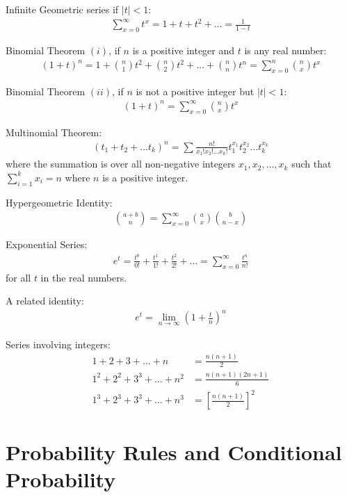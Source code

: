 \documentclass{article}
\begin{document}
Infinite Geometric series if $|t| < 1$:
\begin{align*}
    \sum_{x=0}^{\infty} t^x = 1 + t + t^2 + \ldots = \frac{1}{1-t}
\end{align*}

Binomial Theorem $(i)$, if $n$ is a positive integer and $t$ is any real number:
\begin{align*}
    (1+t)^n = 1 + \binom{n}{1}t^2 + \binom{n}{2}t^2 + \ldots + \binom{n}{n}t^n = \sum_{x=0}^n \binom{n}{x}t^x
\end{align*}

Binomial Theorem $(ii)$, if $n$ is not a positive integer but $|t| < 1$:
\begin{align*}
    (1+t)^n = \sum_{x=0}^{\infty}\binom{n}{x}t^x
\end{align*}

Multinomial Theorem:
\begin{align*}
    (t_1 + t_2 + \ldots t_k)^n  = \sum \frac{n!}{x_1!x_2! \ldots x_k!}t_1^{x_1}t_2^{x_2}\ldots t_k^{x_k}
\end{align*}
where the summation is over all non-negative integers $x_1, x_2, \ldots, x_k$ such that $\sum_{i=1}^{k}x_i = n$ where $n$ is a positive integer. 

Hypergeometric Identity:
\begin{align*}
    \binom{a+b}{n} = \sum_{x=0}^{\infty}\binom{a}{x}\binom{b}{n-x}
\end{align*}

Exponential Series:
\begin{align*}
    e^t = \frac{t^0}{0!} + \frac{t^1}{1!} + \frac{t^2}{2!} + \ldots = \sum_{x=0}^{\infty}\frac{t^n}{n!}
\end{align*}
for all $t$ in the real numbers.

A related identity:
\begin{align*}
    e^t = \lim_{n \to \infty}(1 + \frac{t}{n})^n
\end{align*}

Series involving integers:
\begin{align*}
    1 + 2 + 3 + \ldots + n &= \frac{n(n+1)}{2}\\
    1^2 + 2^2 + 3^3 + \ldots + n^2 &= \frac{n(n+1)(2n+1)}{6}\\
    1^3 + 2^3 + 3^3 + \ldots + n^3 &= [\frac{n(n+1)}{2}]^2
\end{align*}

\section{Probability Rules and Conditional Probability}
\end{document}
